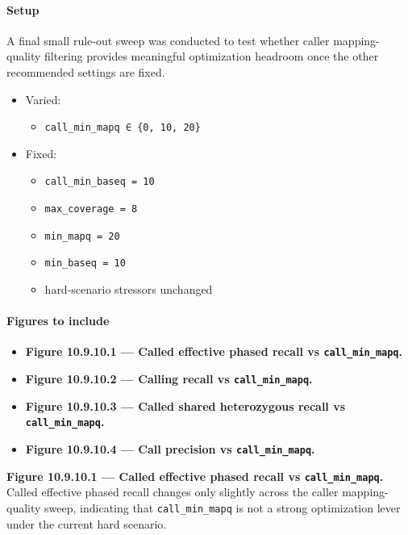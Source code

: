 \documentclass[
]{article}
\providecommand{\tightlist}{%
  \setlength{\itemsep}{0pt}\setlength{\parskip}{0pt}}
\begin{document}
\paragraph{Setup}\label{setup-16}

A final small rule-out sweep was conducted to test whether caller
mapping-quality filtering provides meaningful optimization headroom once
the other recommended settings are fixed.

\begin{itemize}
\tightlist
\item
  Varied:

  \begin{itemize}
  \tightlist
  \item
    \texttt{call\_min\_mapq\ ∈\ \{0,\ 10,\ 20\}}
  \end{itemize}
\item
  Fixed:

  \begin{itemize}
  \tightlist
  \item
    \texttt{call\_min\_baseq\ =\ 10}
  \item
    \texttt{max\_coverage\ =\ 8}
  \item
    \texttt{min\_mapq\ =\ 20}
  \item
    \texttt{min\_baseq\ =\ 10}
  \item
    hard-scenario stressors unchanged
  \end{itemize}
\end{itemize}

\paragraph{Figures to include}\label{figures-to-include-16}

\begin{itemize}
\tightlist
\item
  \textbf{Figure 10.9.10.1 --- Called effective phased recall vs
  \texttt{call\_min\_mapq}.}
\item
  \textbf{Figure 10.9.10.2 --- Calling recall vs
  \texttt{call\_min\_mapq}.}
\item
  \textbf{Figure 10.9.10.3 --- Called shared heterozygous recall vs
  \texttt{call\_min\_mapq}.}
\item
  \textbf{Figure 10.9.10.4 --- Call precision vs
  \texttt{call\_min\_mapq}.}
\end{itemize}

\textbf{Figure 10.9.10.1 --- Called effective phased recall vs
\texttt{call\_min\_mapq}.}\\
Called effective phased recall changes only slightly across the caller
mapping-quality sweep, indicating that \texttt{call\_min\_mapq} is not a
strong optimization lever under the current hard scenario.
\end{document}
